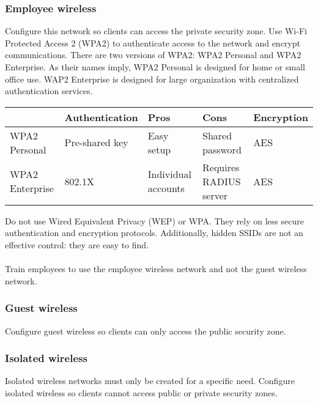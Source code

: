 \subsubsection{Employee wireless}
Configure this network so clients can access the private security zone. Use Wi-Fi Protected Access 2 (WPA2) to authenticate access to the network and encrypt communications. There are two versions of WPA2: WPA2 Personal and WPA2 Enterprise. As their names imply, WPA2 Personal is designed for home or small office use. WAP2 Enterprise is designed for large organization with centralized authentication services.\\
\begin{mdframed}\begin{tabularx}{\textwidth}{ p{1.9cm} | p{2.8cm} | p{2.3cm} | p{2.2cm} | p{2cm} }
 & Authentication & Pros & Cons & Encryption \\
\hline
WPA2 Personal & Pre-shared key &  Easy setup & Shared password & AES \\
\hline
WPA2 Enterprise & 802.1X & Individual accounts & Requires RADIUS server & AES
\end{tabularx}\end{mdframed}
Do not use Wired Equivalent Privacy (WEP) or WPA. They rely on less secure authentication and encryption protocols. Additionally, hidden SSIDs are not an effective control: they are easy to find.\\\\
Train employees to use the employee wireless network and not the guest wireless network.
\subsubsection{Guest wireless}
Configure guest wireless so clients can only access the public security zone.
\subsubsection{Isolated wireless}
Isolated wireless networks must only be created for a specific need. Configure isolated wireless so clients cannot access public or private security zones.
